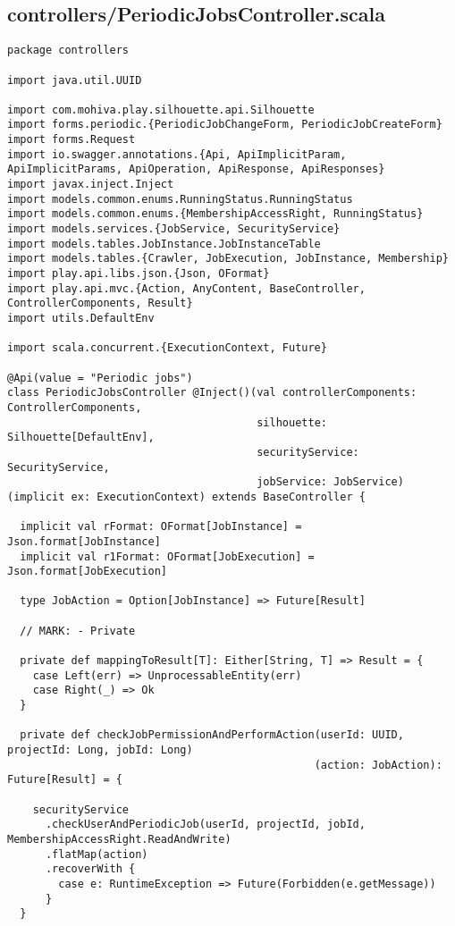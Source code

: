 \subsection{controllers/PeriodicJobsController.scala}
\begin{lstlisting}
package controllers

import java.util.UUID

import com.mohiva.play.silhouette.api.Silhouette
import forms.periodic.{PeriodicJobChangeForm, PeriodicJobCreateForm}
import forms.Request
import io.swagger.annotations.{Api, ApiImplicitParam, ApiImplicitParams, ApiOperation, ApiResponse, ApiResponses}
import javax.inject.Inject
import models.common.enums.RunningStatus.RunningStatus
import models.common.enums.{MembershipAccessRight, RunningStatus}
import models.services.{JobService, SecurityService}
import models.tables.JobInstance.JobInstanceTable
import models.tables.{Crawler, JobExecution, JobInstance, Membership}
import play.api.libs.json.{Json, OFormat}
import play.api.mvc.{Action, AnyContent, BaseController, ControllerComponents, Result}
import utils.DefaultEnv

import scala.concurrent.{ExecutionContext, Future}

@Api(value = "Periodic jobs")
class PeriodicJobsController @Inject()(val controllerComponents: ControllerComponents,
                                       silhouette: Silhouette[DefaultEnv],
                                       securityService: SecurityService,
                                       jobService: JobService) (implicit ex: ExecutionContext) extends BaseController {

  implicit val rFormat: OFormat[JobInstance] = Json.format[JobInstance]
  implicit val r1Format: OFormat[JobExecution] = Json.format[JobExecution]

  type JobAction = Option[JobInstance] => Future[Result]

  // MARK: - Private

  private def mappingToResult[T]: Either[String, T] => Result = {
    case Left(err) => UnprocessableEntity(err)
    case Right(_) => Ok
  }

  private def checkJobPermissionAndPerformAction(userId: UUID, projectId: Long, jobId: Long)
                                                (action: JobAction): Future[Result] = {

    securityService
      .checkUserAndPeriodicJob(userId, projectId, jobId, MembershipAccessRight.ReadAndWrite)
      .flatMap(action)
      .recoverWith {
        case e: RuntimeException => Future(Forbidden(e.getMessage))
      }
  }


\end{lstlisting}
